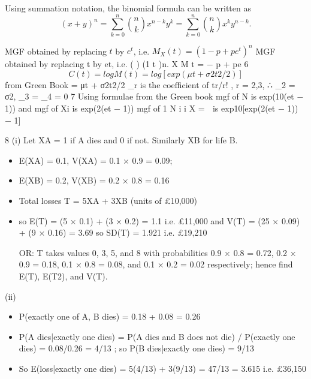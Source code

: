 \documentclass[a4paper,12pt]{article}
\begin{document}
\begin{framed}
 Using summation notation, the binomial formula can be written as 
\[ {\displaystyle (x+y)^{n}=\sum _{k=0}^{n}{n \choose k}x^{n-k}y^{k}=\sum _{k=0}^{n}{n \choose k}x^{k}y^{n-k}.} \]
\end{framed}

MGF obtained by replacing $t$ by $e^t$, i.e. $M_X(t) = (1 - p + pe^t)^{n}$
MGF obtained by replacing t by et, i.e. ( ) (1 t )n.
X M t = − p + pe
6 \[C(t) = logM(t) = log[exp(μt + σ2t2/2)] \]from Green Book
= μt + σ2t2/2
\kappa_r is the coefficient of tr/r! , r = 2,3,
∴ \kappa_2 = σ2, \kappa_3 = \kappa_4 = 0
7 Using formulae from the Green book
mgf of N is exp(10(et − 1)) and mgf of Xi  is exp(2(et − 1))
mgf of
1
N
i
i
X
= 
is exp{10[exp(2(et − 1)) − 1]}


8 (i) Let XA = 1 if A dies and 0 if not. Similarly XB for life B.
\begin{itemize}
    \item E(XA) = 0.1, V(XA) = 0.1 × 0.9 = 0.09;
\item E(XB) = 0.2, V(XB) = 0.2 × 0.8 = 0.16
\item Total losses T = 5XA + 3XB (units of £10,000)
\item so E(T) = (5 × 0.1) + (3 × 0.2) = 1.1 i.e. £11,000
and V(T) = (25 × 0.09) + (9 × 0.16) = 3.69 so SD(T) = 1.921
i.e. £19,210
\item [OR: T takes values 0, 3, 5, and 8 with probabilities 0.9 × 0.8 = 0.72, 0.2 ×
0.9 = 0.18, 0.1 × 0.8 = 0.08, and 0.1 × 0.2 = 0.02 respectively; hence find
E(T), E(T2), and V(T).]
\end{itemize}


(ii) 

\begin{itemize}
    \item P(exactly one of A, B dies) = 0.18 + 0.08 = 0.26
\item P(A dies|exactly one dies) = P(A dies and B does not die) / P(exactly one dies)
= 0.08/0.26 = 4/13 ; so P(B dies|exactly one dies) = 9/13
\item So E(loss|exactly one dies) = 5(4/13) + 3(9/13) = 47/13 = 3.615
i.e. £36,150
\end{itemize}
\end{document}
